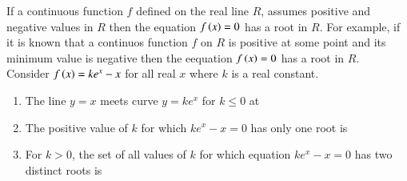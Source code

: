 \documentclass[journal,,12pt,onecolumn]{IEEEtran}
\theoremstyle{remark}
\begin{document}
 If a continuous function $f$ defined on the real line $R$, assumes positive and negative values in $R$ then the equation $f\left(x\right)=0$ has a root in $R$. For example, if it is known that a continuos function $f$ on $R$ is positive at some point and its minimum value is negative then the eequation $f\left(x\right)=0$ has a root in $R$.\\
 Consider $f\left(x\right)=ke^x-x$ for all real $x$ where $k$ is a real constant.
 \begin{enumerate}
 \item The line $y=x$ meets curve $y=ke^x$ for $k \le 0$ at
 \hfill {}\\
    \begin{enumerate}
\end{enumerate}

  



\item  The positive value of $k$ for which $ke^x-x=0$ has only one root is
\hfill {}\\
\begin{enumerate}
\end{enumerate}




\item For $k>0$, the set of all values of $k$ for which equation $ke^x-x=0$ has two distinct roots is 
\hfill {}\\
\begin{enumerate}
\end{enumerate}



\end{enumerate}
\end{document}
